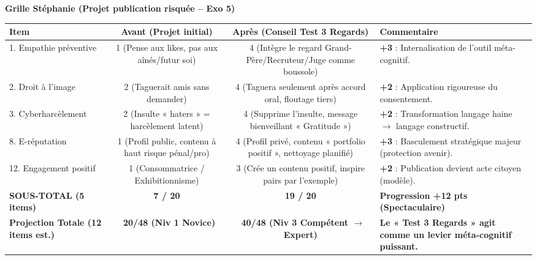 \documentclass[11pt]{article}
\begin{document}
\begin{exoresolu}
\textbf{Grille Stéphanie (Projet publication risquée -- Exo 5)}

\begin{center}
\begin{tabularx}{\linewidth}{|l|c|c|X|}
\hline
\textbf{Item} & \textbf{Avant (Projet initial)} & \textbf{Après (Conseil Test 3 Regards)} & \textbf{Commentaire} \\
\hline
1. Empathie préventive & 1 (Pense aux likes, pas aux aînés/futur soi) & 4 (Intègre le regard Grand-Père/Recruteur/Juge comme boussole) & \textbf{+3} : Internalisation de l'outil méta-cognitif. \\
\hline
2. Droit à l'image & 2 (Taguerait amis sans demander) & 4 (Taguera seulement après accord oral, floutage tiers) & \textbf{+2} : Application rigoureuse du consentement. \\
\hline
3. Cyberharcèlement & 2 (Insulte « haters » = harcèlement latent) & 4 (Supprime l'insulte, message bienveillant « Gratitude ») & \textbf{+2} : Transformation langage haine $\rightarrow$ langage constructif. \\
\hline
8. E-réputation & 1 (Profil public, contenu à haut risque pénal/pro) & 4 (Profil privé, contenu « portfolio positif », nettoyage planifié) & \textbf{+3} : Basculement stratégique majeur (protection avenir). \\
\hline
12. Engagement positif & 1 (Consommatrice / Exhibitionnisme) & 3 (Crée un contenu positif, inspire pairs par l'exemple) & \textbf{+2} : Publication devient acte citoyen (modèle). \\
\hline
\textbf{SOUS-TOTAL (5 items)} & \textbf{7 / 20} & \textbf{19 / 20} & \textbf{Progression +12 pts (Spectaculaire)} \\
\hline
\textbf{Projection Totale (12 items est.)} & \textbf{~20/48 (Niv 1 Novice)} & \textbf{~40/48 (Niv 3 Compétent $\rightarrow$ Expert)} & \textbf{Le « Test 3 Regards » agit comme un levier méta-cognitif puissant.} \\
\hline
\end{tabularx}
\end{center}


\end{exoresolu}
\end{document}
